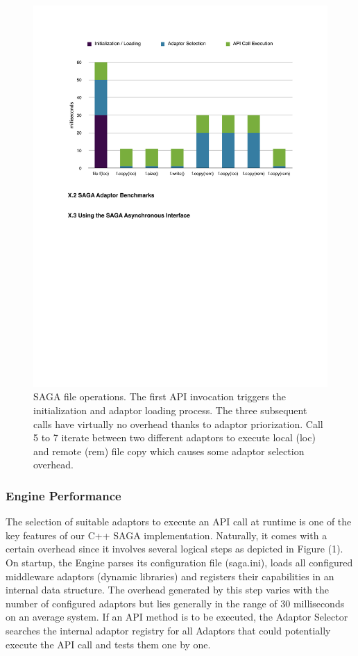 \begin{figure}[!ht]
  \begin{center}
      \includegraphics[width=1\textwidth]{../figures/perf_overhead.pdf}
  \end{center}
 \up\up\up\up\up
  \caption{\small SAGA file operations. The first API invocation triggers the initialization and adaptor loading process. The three subsequent calls have virtually no overhead thanks to adaptor priorization. Call 5 to 7 iterate between two different adaptors to execute local (loc) and remote (rem) file copy which causes some adaptor selection overhead.}
 \label{fig_perf_overhead}
\end{figure}

\subsubsection{Engine Performance}\label{perf_engine}
The selection of suitable adaptors to execute an API call at runtime is one of the key features of our C++ SAGA implementation. Naturally, it comes with a certain overhead since it involves several logical steps as depicted in Figure (1). On startup, the Engine parses its configuration file (saga.ini), loads all configured middleware adaptors (dynamic libraries) and registers their capabilities in an internal data structure. The overhead generated by this step varies with the number of configured adaptors but lies generally in the range of 30 milliseconds on an average system. 
If an API method is to be executed, the Adaptor Selector searches the internal adaptor registry for all Adaptors that could potentially execute the API call and tests them one by one.

